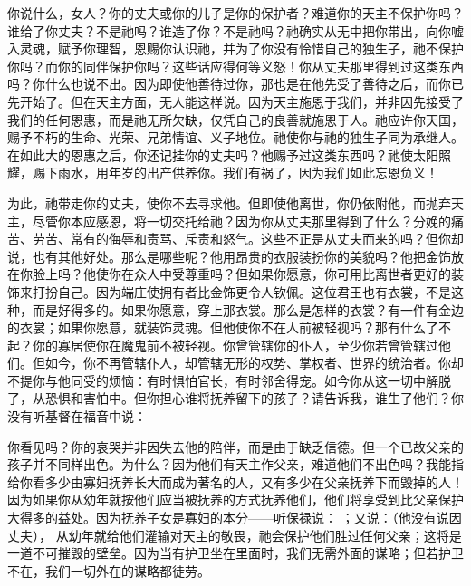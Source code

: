 你说什么，女人？你的丈夫或你的儿子是你的保护者？难道你的天主不保护你吗？谁给了你丈夫？不是祂吗？谁造了你？不是祂吗？祂确实从无中把你带出，向你嘘入灵魂，赋予你理智，恩赐你认识祂，并为了你没有怜惜自己的独生子，祂不保护你吗？而你的同伴保护你吗？这些话应得何等义怒！你从丈夫那里得到过这类东西吗？你什么也说不出。因为即使他善待过你，那也是在他先受了善待之后，而你已先开始了。但在天主方面，无人能这样说。因为天主施恩于我们，并非因先接受了我们的任何恩惠，而是祂无所欠缺，仅凭自己的良善就施恩于人。祂应许你天国，赐予不朽的生命、光荣、兄弟情谊、义子地位。祂使你与祂的独生子同为承继人。在如此大的恩惠之后，你还记挂你的丈夫吗？他赐予过这类东西吗？祂使太阳照耀，赐下雨水，用年岁的出产供养你。我们有祸了，因为我们如此忘恩负义！\par

为此，祂带走你的丈夫，使你不去寻求他。但即使他离世，你仍依附他，而抛弃天主，尽管你本应感恩，将一切交托给祂？因为你从丈夫那里得到了什么？分娩的痛苦、劳苦、常有的侮辱和责骂、斥责和怒气。这些不正是从丈夫而来的吗？但你却说，也有其他好处。那么是哪些呢？他用昂贵的衣服装扮你的美貌吗？他把金饰放在你脸上吗？他使你在众人中受尊重吗？但如果你愿意，你可用比离世者更好的装饰来打扮自己。因为端庄使拥有者比金饰更令人钦佩。这位君王也有衣裳，不是这种，而是好得多的。如果你愿意，穿上那衣裳。那么是怎样的衣裳？有一件有金边的衣裳；如果你愿意，就装饰灵魂。但他使你不在人前被轻视吗？那有什么了不起？你的寡居使你在魔鬼前不被轻视。你曾管辖你的仆人，至少你若曾管辖过他们。但如今，你不再管辖仆人，却管辖无形的权势、掌权者、世界的统治者。你却不提你与他同受的烦恼：有时惧怕官长，有时邻舍得宠。如今你从这一切中解脱了，从恐惧和害怕中。但你担心谁将抚养留下的孩子？请告诉我，谁生了他们？你没有听基督在福音中说： \par

你看见吗？你的哀哭并非因失去他的陪伴，而是由于缺乏信德。但一个已故父亲的孩子并不同样出色。为什么？因为他们有天主作父亲，难道他们不出色吗？我能指给你看多少由寡妇抚养长大而成为著名的人，又有多少在父亲抚养下而毁掉的人！因为如果你从幼年就按他们应当被抚养的方式抚养他们，他们将享受到比父亲保护大得多的益处。因为抚养子女是寡妇的本分——听保禄说： ；又说：（他没有说因丈夫）， 从幼年就给他们灌输对天主的敬畏，祂会保护他们胜过任何父亲；这将是一道不可摧毁的壁垒。因为当有护卫坐在里面时，我们无需外面的谋略；但若护卫不在，我们一切外在的谋略都徒劳。\par

